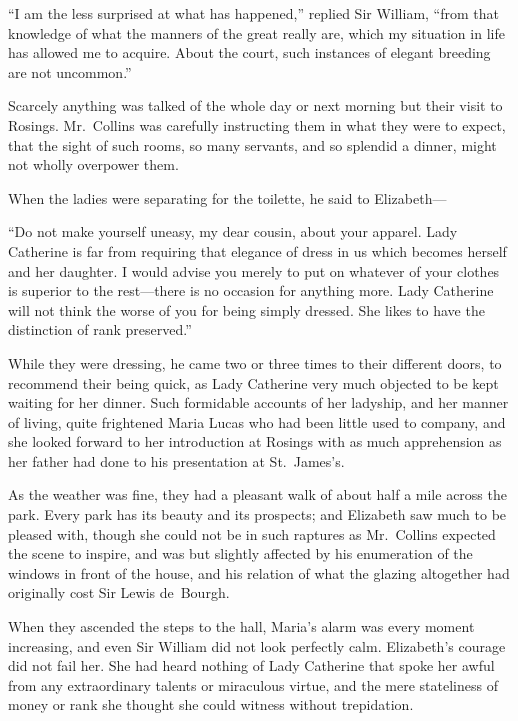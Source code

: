 ``I am the less surprised at what has happened,'' replied Sir
William, ``from that knowledge of what the manners of the great
really are, which my situation in life has allowed me to acquire.
About the court, such instances of elegant breeding are not
uncommon.''

Scarcely anything was talked of the whole day or next morning
but their visit to Rosings.  Mr.\ Collins was carefully instructing
them in what they were to expect, that the sight of such rooms,
so many servants, and so splendid a dinner, might not wholly
overpower them.

When the ladies were separating for the toilette, he said to
Elizabeth---

``Do not make yourself uneasy, my dear cousin, about your
apparel.  Lady Catherine is far from requiring that elegance of
dress in us which becomes herself and her daughter.  I would
advise you merely to put on whatever of your clothes is superior
to the rest---there is no occasion for anything more.  Lady
Catherine will not think the worse of you for being simply
dressed.  She likes to have the distinction of rank preserved.''

While they were dressing, he came two or three times to their
different doors, to recommend their being quick, as Lady
Catherine very much objected to be kept waiting for her dinner.
Such formidable accounts of her ladyship, and her manner of
living, quite frightened Maria Lucas who had been little used to
company, and she looked forward to her introduction at Rosings
with as much apprehension as her father had done to his
presentation at St.\ James's.

As the weather was fine, they had a pleasant walk of about half
a mile across the park.  Every park has its beauty and its
prospects; and Elizabeth saw much to be pleased with, though
she could not be in such raptures as Mr.\ Collins expected the
scene to inspire, and was but slightly affected by his enumeration
of the windows in front of the house, and his relation of what the
glazing altogether had originally cost Sir Lewis de~Bourgh.

When they ascended the steps to the hall, Maria's alarm was
every moment increasing, and even Sir William did not look
perfectly calm.  Elizabeth's courage did not fail her.  She had
heard nothing of Lady Catherine that spoke her awful from any
extraordinary talents or miraculous virtue, and the mere
stateliness of money or rank she thought she could witness
without trepidation.

